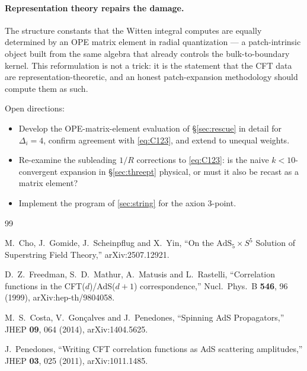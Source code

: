 \documentclass[11pt]{article}
\begin{document}
\paragraph{Representation theory repairs the damage.} The structure constants that the Witten integral computes are equally determined by an OPE matrix element in radial quantization --- a patch-intrinsic object built from the same algebra that already controls the bulk-to-boundary kernel. This reformulation is not a trick: it is the statement that the CFT data are representation-theoretic, and an honest patch-expansion methodology should compute them as such.

Open directions:
\begin{itemize}
\item Develop the OPE-matrix-element evaluation of \S\ref{sec:rescue} in detail for $\Delta_i=4$, confirm agreement with \cref{eq:C123}, and extend to unequal weights.
\item Re-examine the subleading $1/R$ corrections to \cref{eq:C123}: is the naive $k<10$-convergent expansion in \S\ref{sec:threept} physical, or must it also be recast as a matrix element?
\item Implement the program of \cref{sec:string} for the axion 3-point.
\end{itemize}

\begin{thebibliography}{99}

M.~Cho, J.~Gomide, J.~Scheinpflug and X.~Yin,
``On the $\mathrm{AdS}_5\times S^5$ Solution of Superstring Field Theory,''
arXiv:2507.12921.

D.~Z.~Freedman, S.~D.~Mathur, A.~Matusis and L.~Rastelli,
``Correlation functions in the CFT($d$)/AdS($d+1$) correspondence,''
Nucl.\ Phys.\ B {\bf 546}, 96 (1999), arXiv:hep-th/9804058.

M.~S.~Costa, V.~Gon\c{c}alves and J.~Penedones,
``Spinning AdS Propagators,''
JHEP {\bf 09}, 064 (2014), arXiv:1404.5625.

J.~Penedones,
``Writing CFT correlation functions as AdS scattering amplitudes,''
JHEP {\bf 03}, 025 (2011), arXiv:1011.1485.

\end{thebibliography}
\end{document}
